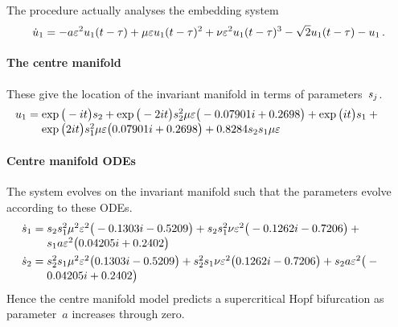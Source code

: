 The procedure actually analyses the embedding system
\begin{equation*}
\dot u_{1}=-a \varepsilon^{2} u_1(t-\tau)
+\mu  \varepsilon  u_1(t-\tau)^{2}
+\nu  \varepsilon^{2} u_1(t-\tau)^{3}
-\sqrt {2} u_1(t-\tau)-u\sb1
\,.
\end{equation*}

\paragraph{The centre manifold} 
These give the location of the invariant manifold in
terms of parameters~\(s\sb j\).
\begin{align*}&
u_{1}=\ParMath{
\exp \big(-i t\big) s_{2}+\exp \big(-2 i t\big) s_{2}^{2} \mu  
\eps \big(-0.07901 i+0.2698\big)+\exp \big(i t\big) s_{1}+\exp \big(
2 i t\big) s_{1}^{2} \mu  \eps \big(0.07901 i+0.2698\big)+0.8284 s
_{2} s_{1} \mu  \eps
}
\end{align*}
 
\paragraph{Centre manifold ODEs} 
The system evolves on the invariant manifold such
that the parameters evolve according to these ODEs.
\begin{align*}&
\dot s_{1}=\ParMath{
s_{2} s_{1}^{2} \mu ^{2} \eps^{2} \big(-0.1303 i-0.5209
\big)+s_{2} s_{1}^{2} \nu  \eps^{2} \big(-0.1262 i-0.7206\big)+s_{1}
 a \eps^{2} \big(0.04205 i+0.2402\big)
}
 \\&
\dot s_{2}=\ParMath{
s_{2}^{2} s_{1} \mu ^{2} \eps^{2} \big(0.1303 i-0.5209
\big)+s_{2}^{2} s_{1} \nu  \eps^{2} \big(0.1262 i-0.7206\big)+s_{2} 
a \eps^{2} \big(-0.04205 i+0.2402\big)
}
\end{align*}
Hence the centre manifold model predicts a supercritical Hopf bifurcation as parameter~\(a\) increases through zero.

